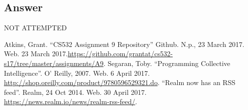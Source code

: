 \documentclass[letterpaper,11pt]{article}
\begin{document}
\subsection*{Answer}

\begin{center}
\Huge{NOT ATTEMPTED}
\end{center}


\clearpage

\clearpage



\begin{thebibliography}{9}
Atkins, Grant. ``CS532 Assignment 9 Repository'' Github. N.p., 23 March 2017. Web. 23 March 2017.\url{https://github.com/grantat/cs532-s17/tree/master/assignments/A9}.
Segaran, Toby. ``Programming Collective Intelligence''. O' Reilly, 2007. Web. 6 April 2017. \url{http://shop.oreilly.com/product/9780596529321.do}.
``Realm now has an RSS feed''. Realm, 24 Oct 2014. Web. 30 April 2017. \url{https://news.realm.io/news/realm-rss-feed/}.
\end{thebibliography}
\end{document}
